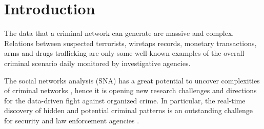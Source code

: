 \section{Introduction}
\label{sec:introduction}


The data that a criminal network can generate are massive and complex. Relations between suspected terrorists, wiretaps records, monetary transactions, arms and drugs trafficking are only some well-known examples of the overall criminal scenario daily monitored by investigative agencies.


The social networks analysis (SNA) has a great potential to uncover complexities of criminal networks \cite{berlusconi2017social}, hence it is opening new research challenges and directions for the data-driven fight against organized crime.
%
In particular, the real-time discovery of hidden and potential criminal patterns is an outstanding challenge for security and law enforcement agencies \cite{berlusconi2016link}.



